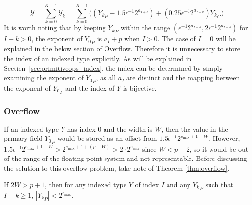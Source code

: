       \begin{equation}
        \mathcal{Y} = \sum\limits_{k = 0}^{K - 1} \mathcal{Y}_k = \sum\limits_{k = 0}^{K - 1} \bigl(({Y_k}_P - 1.5 \epsilon^{-1}2^{a_{I + k}}) + (0.25\epsilon^{-1}2^{a_{I + k}}){Y_k}_C\bigr)
        \label{eq:indexedvalue}
      \end{equation}
      It is worth noting that by keeping ${Y_k}_P$ within the range
      \(
      	(\epsilon^{-1} 2^{a_{I + k}}, 2 \epsilon^{-1} 2^{a_{I + k}})
      \)
      for $I+k > 0$, the exponent of ${Y_0}_P$ is $a_I + p$ when $I > 0$.
      The case of $I = 0$ will be explained in the below section of Overflow.
      Therefore it is unnecessary to store the index of an indexed type explicitly.
      As will be explained in
      Section~\ref{sec:primitiveops_index}, the index can be determined by
      simply examining the exponent of ${Y_0}_P$, as all $a_I$ are distinct and
      the mapping between the exponent of ${Y_0}_P$ and the index of $Y$ is
      bijective.

    \subsubsection{Overflow}
      \label{sec:indexed_overflow}
      If an indexed type $Y$ has index 0 and the width is $W$, then the value
      in the primary field ${Y_0}_P$ would be stored as an offset from
      $1.5\epsilon^{-1}2^{e_{\max} + 1 - W}$. However,
      \(
        1.5\epsilon^{-1}2^{e_{\max} + 1 - W} > 2^{e_{\max} + 1 + (p - W)}
            > 2 \cdot 2^{e_{\max}}
      \) since $W < p - 2$, so it would be out of the range of the
      floating-point system and not representable. Before discussing the
      solution to this overflow problem, take note of Theorem
      \ref{thm:overflow}.

      \begin{samepage}
      \begin{thm}
        If $2 W > p + 1$, then for any indexed type $Y$ of index $I$ and any ${Y_k}_P$ such that $I + k \geq 1$, $|{Y_k}_P| < 2^{e_{\max}}$.
        \label{thm:overflow}
      \end{thm}
    \end{samepage}

